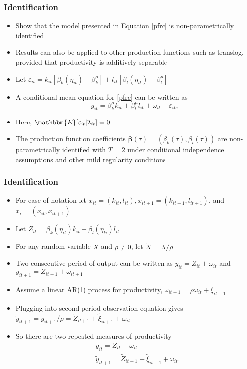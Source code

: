 \documentclass[xcolor={dvipsnames}, notheorems]{beamer}
\theoremstyle{plain}
\begin{document}

\begin{frame}
\frametitle{Identification}
\begin{itemize}
\item Show that the model presented in Equation \eqref{pfrc} is non-parametrically identified
\item Results can also be applied to other production functions such as translog, provided that productivity is additively separable
\item Let $\varepsilon_{it}=k_{it}[\beta_{k}(\eta_{it})-\beta^{\mu}_{k}]+l_{it}[\beta_{l}(\eta_{it})-\beta^{\mu}_{l}]$
\item A conditional mean equation for \eqref{pfrc} can be written as
\begin{equation}\label{meanversion}
y_{it}=\beta_{k}^{\mu}k_{it}+\beta_{l}^{\mu}l_{it}+\omega_{it}+\varepsilon_{it},
\end{equation}
\item Here, $\mathbbm{E}[\varepsilon_{it}|\mathcal{I}_{it}]=0$
\item The production function coefficients $\boldsymbol{\beta}(\tau)=(\beta_{k}(\tau), \beta_{l}(\tau))$ are non-parametrically identified with $T=2$ under conditional independence assumptions and other mild regularity conditions
\end{itemize}
\end{frame}


\begin{frame}
\frametitle{Identification}
\begin{itemize}
\item For ease of notation let $x_{it}=(k_{it}, l_{it}), x_{it+1}=(k_{it+1}, l_{it+1})$, and $x_{i}=(x_{it}, x_{it+1})$
\item Let $Z_{it}=\beta_{k}(\eta_{it})k_{it}+\beta_{l}(\eta_{ti})l_{it}$
\item For any random variable $X$ and $\rho\neq 0$, let $\tilde{X}=X/\rho$
\item Two consecutive period of output can be written as $y_{it}=Z_{it}+\omega_{it}$ and $y_{it+1}=Z_{it+1}+\omega_{it+1}$
\item  Assume a linear AR(1) process for productivity, $\omega_{it+1}=\rho\omega_{it}+\xi_{it+1}$
\item Plugging into second period observation equation gives $\tilde{y}_{it+1}=y_{it+1}/\rho=\tilde{Z}_{it+1}+\tilde{\xi}_{it+1}+\omega_{it}$
\item So there are two repeated measures of productivity
\begin{equation} \label{repeatedmeas}
\begin{split}
&y_{it}=Z_{it}+\omega_{it}\\
&\tilde{y}_{it+1}=\tilde{Z}_{it+1}+\tilde{\xi}_{it+1}+\omega_{it}.
\end{split}
\end{equation}
\end{itemize}
\end{frame}
\end{document}
